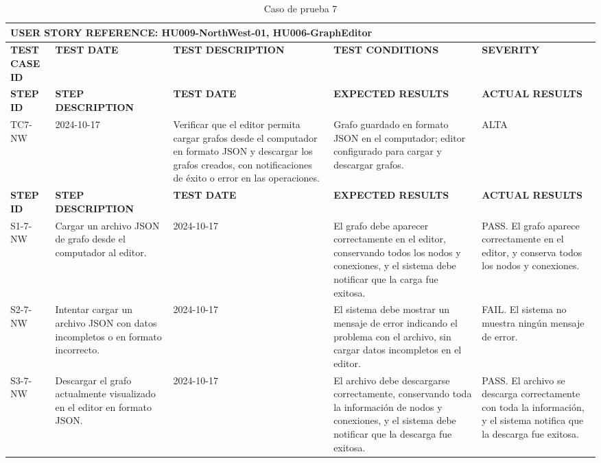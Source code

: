 \small %
\renewcommand{\arraystretch}{1.0} %
\setlength{\tabcolsep}{4pt} %

\begin{longtable}{|p{2cm}|p{3cm}|p{3cm}|p{3cm}|p{3cm}|}
    \caption{Caso de prueba 7} \label{tab:casos_prueba7} \\
    \hline
    \multicolumn{5}{|l|}{\textbf{USER STORY REFERENCE: HU009-NorthWest-01, HU006-GraphEditor}} \\ \hline
    \textbf{TEST CASE ID} & \textbf{TEST DATE} & \textbf{TEST DESCRIPTION} & \textbf{TEST CONDITIONS} & \textbf{SEVERITY} \\ \hline
    \endfirsthead
    \hline
    \textbf{STEP ID} & \textbf{STEP DESCRIPTION} & \textbf{TEST DATE} & \textbf{EXPECTED RESULTS} & \textbf{ACTUAL RESULTS} \\ \hline
    \endhead
    TC7-NW & 2024-10-17 & Verificar que el editor permita cargar grafos desde el computador en formato JSON y descargar los grafos creados, con notificaciones de éxito o error en las operaciones. & Grafo guardado en formato JSON en el computador; editor configurado para cargar y descargar grafos. & ALTA \\ \hline
    \textbf{STEP ID} & \textbf{STEP DESCRIPTION} & \textbf{TEST DATE} & \textbf{EXPECTED RESULTS} & \textbf{ACTUAL RESULTS} \\ \hline
    S1-7-NW & Cargar un archivo JSON de grafo desde el computador al editor. & 2024-10-17 & El grafo debe aparecer correctamente en el editor, conservando todos los nodos y conexiones, y el sistema debe notificar que la carga fue exitosa. & PASS. El grafo aparece correctamente en el editor, y conserva todos los nodos y conexiones. \\ \hline
    S2-7-NW & Intentar cargar un archivo JSON con datos incompletos o en formato incorrecto. & 2024-10-17 & El sistema debe mostrar un mensaje de error indicando el problema con el archivo, sin cargar datos incompletos en el editor. & FAIL. El sistema no muestra ningún mensaje de error. \\ \hline
    S3-7-NW & Descargar el grafo actualmente visualizado en el editor en formato JSON. & 2024-10-17 & El archivo debe descargarse correctamente, conservando toda la información de nodos y conexiones, y el sistema debe notificar que la descarga fue exitosa. & PASS. El archivo se descarga correctamente con toda la información, y el sistema notifica que la descarga fue exitosa. \\ \hline
\end{longtable}